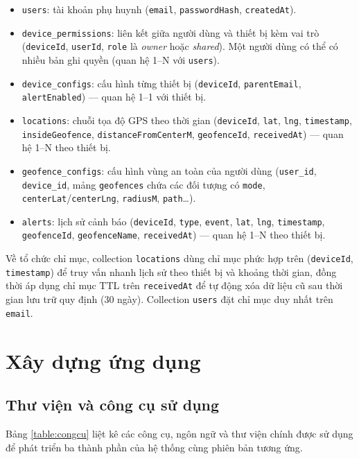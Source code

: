 \documentclass[../DoAn.tex]{subfiles}
\begin{document}
\begin{itemize}
    \item \texttt{users}: tài khoản phụ huynh (\texttt{email}, \texttt{passwordHash}, \texttt{createdAt}).
    \item \texttt{device\_permissions}: liên kết giữa người dùng và thiết bị kèm vai trò (\texttt{deviceId}, \texttt{userId}, \texttt{role} là \textit{owner} hoặc \textit{shared}). Một người dùng có thể có nhiều bản ghi quyền (quan hệ 1--N với \texttt{users}).
    \item \texttt{device\_configs}: cấu hình từng thiết bị (\texttt{deviceId}, \texttt{parentEmail}, \texttt{alertEnabled}) — quan hệ 1--1 với thiết bị.
    \item \texttt{locations}: chuỗi tọa độ GPS theo thời gian (\texttt{deviceId}, \texttt{lat}, \texttt{lng}, \texttt{timestamp}, \texttt{insideGeofence}, \texttt{distanceFromCenterM}, \texttt{geofenceId}, \texttt{receivedAt}) — quan hệ 1--N theo thiết bị.
    \item \texttt{geofence\_configs}: cấu hình vùng an toàn của người dùng (\texttt{user\_id}, \texttt{device\_id}, mảng \texttt{geofences} chứa các đối tượng có \texttt{mode}, \texttt{centerLat}/\texttt{centerLng}, \texttt{radiusM}, \texttt{path}\dots).
    \item \texttt{alerts}: lịch sử cảnh báo (\texttt{deviceId}, \texttt{type}, \texttt{event}, \texttt{lat}, \texttt{lng}, \texttt{timestamp}, \texttt{geofenceId}, \texttt{geofenceName}, \texttt{receivedAt}) — quan hệ 1--N theo thiết bị.
\end{itemize}

Về tổ chức chỉ mục, collection \texttt{locations} dùng chỉ mục phức hợp trên (\texttt{deviceId}, \texttt{timestamp}) để truy vấn nhanh lịch sử theo thiết bị và khoảng thời gian, đồng thời áp dụng chỉ mục TTL trên \texttt{receivedAt} để tự động xóa dữ liệu cũ sau thời gian lưu trữ quy định (30 ngày). Collection \texttt{users} đặt chỉ mục duy nhất trên \texttt{email}.

\section{Xây dựng ứng dụng}

\subsection{Thư viện và công cụ sử dụng}

Bảng \ref{table:congcu} liệt kê các công cụ, ngôn ngữ và thư viện chính được sử dụng để phát triển ba thành phần của hệ thống cùng phiên bản tương ứng.
\end{document}
